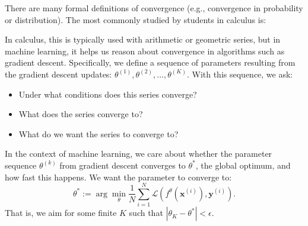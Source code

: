 There are many formal definitions of convergence (e.g., convergence in probability or distribution). The most commonly studied by students in calculus is:





In calculus, this is typically used with arithmetic or geometric series, but in machine learning, it helps us reason about convergence in algorithms such as gradient descent. Specifically, we define a sequence of parameters resulting from the gradient descent updates: \(\theta^{(1)}, \theta^{(2)}, \dots, \theta^{(K)}\). With this sequence, we ask:

\begin{itemize}
    \item Under what conditions does this series converge?
    \item What does the series converge to?
    \item What do we want the series to converge to?
\end{itemize}

In the context of machine learning, we care about whether the parameter sequence \(\theta^{(k)}\) from gradient descent converges to \(\theta^*\), the global optimum, and how fast this happens. We want the parameter to converge to:
\[
    \theta^* := \arg\min_\theta \frac{1}{N} \sum_{i=1}^{N} \mathcal{L}(f^\theta(\bm{x}^{(i)}), \bm{y}^{(i)}).
\]
That is, we aim for some finite \(K\) such that \(|\theta_K - \theta^*| < \epsilon\).

